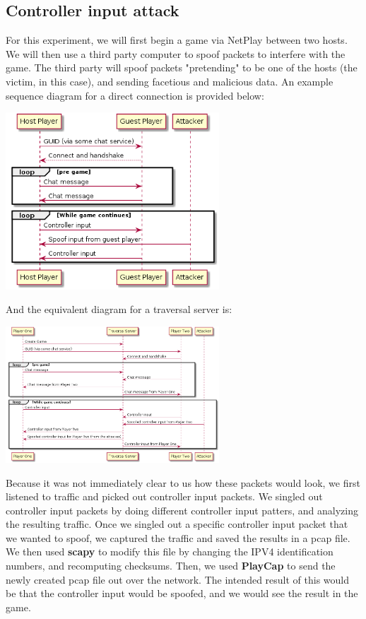 \documentclass[conference]{IEEEtran}
\begin{document}
\subsection{Controller input attack}
For this experiment, we will first begin a game  via NetPlay between two hosts.
We will then use a third party computer to spoof packets to interfere with the game.
The third party will spoof packets "pretending" to be one of the hosts (the victim, in this case), and sending facetious and malicious data.
An example sequence diagram for a direct connection is provided below:
\begin{center}
\includegraphics[width=8cm]{Figures/Sequence1}
\end{center}
\vspace{0.5cm}
And the equivalent diagram for a traversal server is:
\begin{center}
\includegraphics[width=8cm]{Figures/Sequence2}
\end{center}

Because it was not immediately clear to us how these packets would look, we first listened to traffic and picked out controller input packets. 
We singled out controller input packets by doing different controller input patters, and analyzing the resulting traffic.
Once we singled out a specific controller input packet that we wanted to spoof, we captured the traffic and saved the results in a pcap file.
We then used \textbf{scapy} to modify this file by changing the IPV4 identification numbers, and recomputing checksums.
Then, we used \textbf{PlayCap} to send the newly created pcap file out over the network.
The intended result of this would be that the controller input would be spoofed, and we would see the result in the game. 
\end{document}
